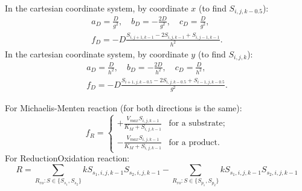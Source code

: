 \documentclass[a4paper,10pt]{article}
\begin{document}
In the cartesian coordinate system, by coordinate $x$ (to find $S_{i,j,k-0.5}$):
\begin{multline}
    a_D = \frac{D}{g^2},\quad
    b_D = -\frac{2 D}{g^2},\quad
    c_D = \frac{D}{g^2},\\
    f_D = - D \frac{S_{i,j+1,k-1} - 2 S_{i,j,k-1} + S_{i,j-1,k-1}}{h^2}.
\end{multline}
In the cartesian coordinate system, by coordinate $y$ (to find $S_{i,j,k}$):
\begin{multline}
    a_D = \frac{D}{h^2},\quad
    b_D = -\frac{2 D}{h^2},\quad
    c_D = \frac{D}{h^2},\\
    f_D = - D \frac{S_{i+1,j,k-0.5} - 2 S_{i,j,k-0.5} + S_{i-1,j,k-0.5}}{g^2}.
\end{multline}

For Michaelis-Menten reaction (for both directions is the same):
\begin{equation}
    f_R =
        \begin{cases}
            +\frac{V_{max} S_{i,j,k-1}}{K_M + S_{i,j,k-1}} &\text{for a substrate};\\
            -\frac{V_{max} S_{i,j,k-1}}{K_M + S_{i,j,k-1}} &\text{for a product}.
        \end{cases}
\end{equation}
For ReductionOxidation reaction:
\begin{equation}
    R =
         \sum_{R_{ro} : S \in \{S_{s_1}, S_{s_2}\}} k S_{s_1,i,j,k-1} S_{s_2,i,j,k-1}
        -\sum_{R_{ro} : S \in \{S_{p_1}, S_{p_2}\}} k S_{s_1,i,j,k-1} S_{s_2,i,j,k-1}
\end{equation}
\end{document}
